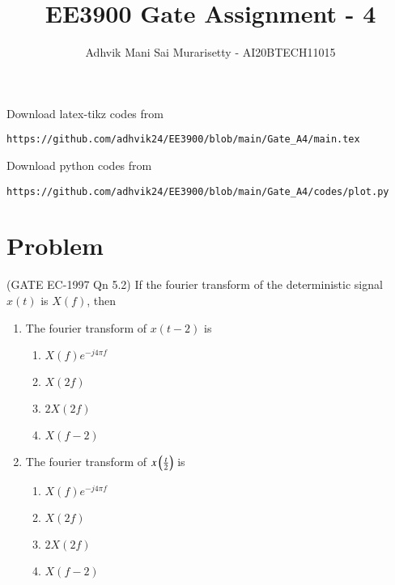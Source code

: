 \documentclass[journal,12pt,twocolumn]{IEEEtran}
\begin{document}
\vspace{3cm}
\title{EE3900 Gate Assignment - 4}
\author{Adhvik Mani Sai Murarisetty - AI20BTECH11015}
\maketitle
\newpage
\bigskip
\renewcommand{\thetable}{\theenumi}

Download latex-tikz codes from 
%
\begin{lstlisting}
https://github.com/adhvik24/EE3900/blob/main/Gate_A4/main.tex
\end{lstlisting}
%
Download python codes from 
%
\begin{lstlisting}
https://github.com/adhvik24/EE3900/blob/main/Gate_A4/codes/plot.py
\end{lstlisting}
\section*{Problem}
(GATE EC-1997 Qn 5.2) If the fourier transform of the deterministic signal $x(t)$ is $X(f)$, then
\begin{enumerate}
    \item The fourier transform of $x(t-2)$ is
    \begin{enumerate} 
        \item $X(f)e^{-j4\pi f}$
        \item $X(2f)$
        \item $2X(2f)$
        \item $X(f-2)$
    \end{enumerate}
    \item The fourier transform of $x\left(\frac{t}{2}\right)$ is
    \begin{enumerate} 
        \item $X(f)e^{-j4\pi f}$
        \item $X(2f)$
        \item $2X(2f)$
        \item $X(f-2)$
    \end{enumerate}
\end{enumerate}
\end{document}

